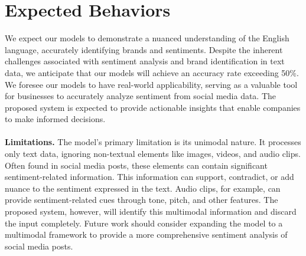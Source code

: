 \documentclass{article}
\begin{document}
\section*{Expected Behaviors}
We expect our models to demonstrate a nuanced understanding of the English
language, accurately identifying brands and sentiments. Despite the inherent
challenges associated with sentiment analysis and brand identification in text
data, we anticipate that our models will achieve an accuracy rate exceeding
50\%. We foresee our models to have real-world applicability, serving as a
valuable tool for businesses to accurately analyze sentiment from social media
data. The proposed system is expected to provide actionable insights that
enable companies to make informed decisions.\\
\\
\textbf{Limitations.} The model's primary limitation is its unimodal nature. It
processes only text data, ignoring non-textual elements like images, videos,
and audio clips. Often found in social media posts, these elements can contain
significant sentiment-related information. This information can support,
contradict, or add nuance to the sentiment expressed in the text. Audio clips,
for example, can provide sentiment-related cues through tone, pitch, and other
features. The proposed system, however, will identify this multimodal
information and discard the input completely. Future work should consider
expanding the model to a multimodal framework to provide a more comprehensive
sentiment analysis of social media posts.

\newpage
\end{document}
